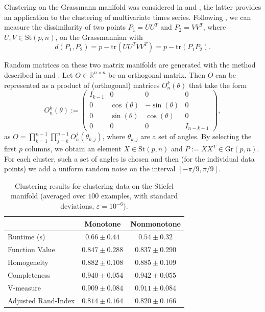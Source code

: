 \documentclass[a4paper, 12pt]{article}
\numberwithin{equation}{section}
\theoremstyle{bolddef}
\theoremstyle{definition}
\theoremstyle{boldplain}
\newcommand{\R}{\mathbb{R}}
\begin{document}
Clustering on the Grassmann manifold was considered in \cite{Gruber2006, Cetingul2009} and \cite{Oh2019}, the latter provides an application to the clustering of multivariate times series. Following \cite{Chikuse2003, Cetingul2009, Oh2019}, we can measure the dissimilarity of two points $P_1 = UU^T$ and $P_2 = VV^T$, where $U, V \in \mathrm{St}(p, n)$, on the Grassmannian with
\begin{equation*}
	d(P_1, P_2) = p - \mathrm{tr}(UU^TVV^T) = p - \mathrm{tr}(P_1 P_2).
\end{equation*}

Random matrices on these two matrix manifolds are generated with the method described in \cite{Chikuse2003} and \cite{Cetingul2009}: Let $O \in \R^{n \times n}$ be an orthogonal matrix. Then $O$ can be represented as a product of (orthogonal) matrices $O^k_n(\theta)$ that take the form
\begin{equation*}
	O^k_n(\theta) := \begin{pmatrix} I_{k-1} & 0 &0 &0\\ 0  & \cos(\theta) & - \sin(\theta) & 0\\ 0 & \sin(\theta) & \cos(\theta) & 0\\ 0 & 0 &0 & I_{n-k-1}\end{pmatrix},
\end{equation*}
as $O = \prod_{k = 1}^{n-1} \prod_{j = k}^{n-1} O_n^j(\theta_{k, j})$, where $\theta_{k,j}$ are a set of angles. By selecting the first $p$ columns, we obtain an element $X \in \mathrm{St}(p,n)$ and $P := XX^T \in \mathrm{Gr}(p,n)$. For each cluster, such a set of angles is chosen and then (for the individual data points) we add a uniform random noise on the interval $[-\pi/9, \pi/9]$. 

\begin{table}[ht]
\centering
\begin{tabular}{lcc}
\toprule
 & Monotone & Nonmonotone \\
\midrule
Runtime (s) & $0.66 \pm 0.44$ & $0.54 \pm 0.32$ \\
Function Value & $0.847 \pm 0.288$ & $0.837 \pm 0.290$ \\
Homogeneity & $0.882 \pm 0.108$ & $0.885 \pm 0.109$ \\
Completeness & $0.940 \pm 0.054$ & $0.942 \pm 0.055$ \\
V-measure & $0.909 \pm 0.084$ & $0.911 \pm 0.084$ \\
Adjusted Rand-Index & $0.814 \pm 0.164$ & $0.820 \pm 0.166$ \\
\bottomrule
\end{tabular}
	\caption{Clustering results for clustering data on the Stiefel manifold (averaged over $100$ examples, with standard deviations, $\varepsilon = 10^{-6}$).}
\label{tab:stiefelclustering}
\end{table}
\end{document}
